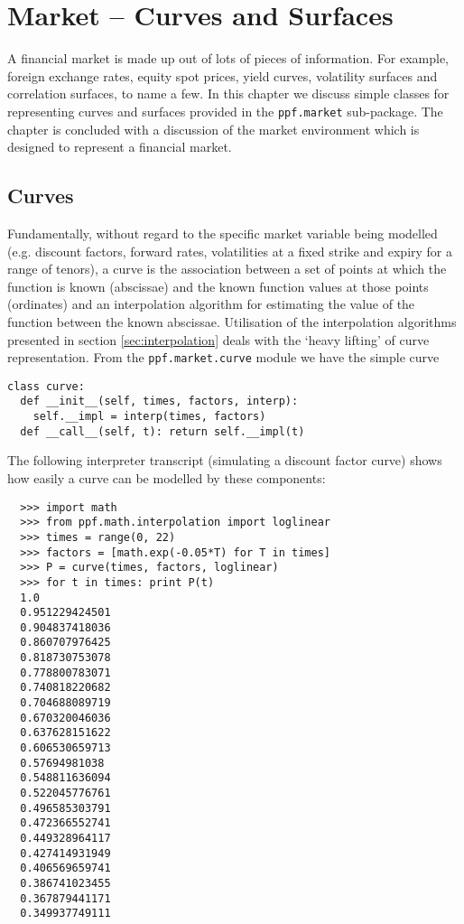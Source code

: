 \chapter{Market -- Curves and
Surfaces}\label{ch:market-curves-surfaces}

A financial market is made up out of lots of pieces of information. For example, 
foreign exchange rates, equity spot prices, yield curves, volatility surfaces
and correlation surfaces, to name a few. In this chapter we discuss simple classes 
for representing curves and surfaces provided in the \verb|ppf.market|
sub-package. The chapter is concluded with a discussion of the market
environment which is designed to represent a financial market.


\section{Curves}
Fundamentally, without regard to the specific market variable being modelled
(e.g. discount factors, forward rates, volatilities at a fixed strike
and expiry for a range of tenors), a curve is the association between a set
of points at which the function is known (abscissae) and the known
function values at those points (ordinates) and an interpolation
algorithm for estimating the value of the function between the known
abscissae. Utilisation of the interpolation algorithms presented in
section \ref{sec:interpolation} deals with the `heavy lifting' of
curve representation. From the \verb|ppf.market.curve| module we have
the simple curve
\begin{verbatim}
class curve:
  def __init__(self, times, factors, interp):
    self.__impl = interp(times, factors)
  def __call__(self, t): return self.__impl(t)
\end{verbatim}
The following interpreter transcript (simulating a discount factor
curve) shows how easily a curve can be modelled by these components:
\begin{verbatim}
  >>> import math
  >>> from ppf.math.interpolation import loglinear
  >>> times = range(0, 22)
  >>> factors = [math.exp(-0.05*T) for T in times]
  >>> P = curve(times, factors, loglinear)
  >>> for t in times: print P(t)
  1.0
  0.951229424501
  0.904837418036
  0.860707976425
  0.818730753078
  0.778800783071
  0.740818220682
  0.704688089719
  0.670320046036
  0.637628151622
  0.606530659713
  0.57694981038
  0.548811636094
  0.522045776761
  0.496585303791
  0.472366552741
  0.449328964117
  0.427414931949
  0.406569659741
  0.386741023455
  0.367879441171
  0.349937749111
\end{verbatim}

